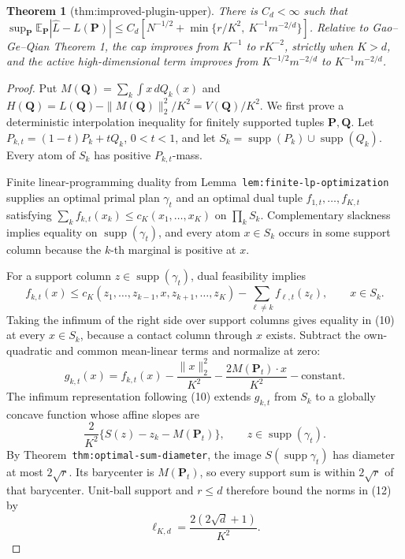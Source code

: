 \documentclass{article}
\newtheorem{theorem}{Theorem}
\begin{document}
\begin{theorem}[thm:improved-plugin-upper]\label{thm:improved-plugin-upper}
There is \(C_d<\infty\) such that \(\sup_{\mathbf P}\mathbb E_{\mathbf P}|\widehat L-L(\mathbf P)|\le C_d[N^{-1/2}+\min\{r/K^2,\ K^{-1}m^{-2/d}\}]\). Relative to Gao--Ge--Qian Theorem 1, the cap improves from \(K^{-1}\) to \(rK^{-2}\), strictly when \(K>d\), and the active high-dimensional term improves from \(K^{-1/2}m^{-2/d}\) to \(K^{-1}m^{-2/d}\).
\end{theorem}
\begin{proof}
Put \(M(\mathbf Q)=\sum_k\int x\,dQ_k(x)\) and \(H(\mathbf Q)=L(\mathbf Q)-\|M(\mathbf Q)\|_2^2/K^2=V(\mathbf Q)/K^2\). We first prove a deterministic interpolation inequality for finitely supported tuples \(\mathbf P,\mathbf Q\). Let \(P_{k,t}=(1-t)P_k+tQ_k\), \(0<t<1\), and let \(S_k=\operatorname{supp}(P_k)\cup\operatorname{supp}(Q_k)\). Every atom of \(S_k\) has positive \(P_{k,t}\)-mass.

Finite linear-programming duality from Lemma~\texttt{lem:finite-lp-optimization} supplies an optimal primal plan \(\gamma_t\) and an optimal dual tuple \(f_{1,t},\ldots,f_{K,t}\) satisfying \(\sum_kf_{k,t}(x_k)\le c_K(x_1,\ldots,x_K)\) on \(\prod_kS_k\). Complementary slackness implies equality on \(\operatorname{supp}(\gamma_t)\), and every atom \(x\in S_k\) occurs in some support column because the \(k\)-th marginal is positive at \(x\).

For a support column \(z\in\operatorname{supp}(\gamma_t)\), dual feasibility implies
\[
f_{k,t}(x)\le c_K(z_1,\ldots,z_{k-1},x,z_{k+1},\ldots,z_K)
-\sum_{\ell\ne k}f_{\ell,t}(z_\ell), \qquad x\in S_k. \tag{10}
\]
Taking the infimum of the right side over support columns gives equality in (10) at every \(x\in S_k\), because a contact column through \(x\) exists. Subtract the own-quadratic and common mean-linear terms and normalize at zero:
\[
g_{k,t}(x)=f_{k,t}(x)-\frac{\|x\|_2^2}{K^2}
-\frac{2M(\mathbf P_t)\mathbin\cdot x}{K^2}-\text{constant}. \tag{11}
\]
The infimum representation following (10) extends \(g_{k,t}\) from \(S_k\) to a globally concave function whose affine slopes are
\[
\frac{2}{K^2}\{S(z)-z_k-M(\mathbf P_t)\},\qquad z\in\operatorname{supp}(\gamma_t). \tag{12}
\]
By Theorem~\texttt{thm:optimal-sum-diameter}, the image \(S(\operatorname{supp}\gamma_t)\) has diameter at most \(2\sqrt r\). Its barycenter is \(M(\mathbf P_t)\), so every support sum is within \(2\sqrt r\) of that barycenter. Unit-ball support and \(r\le d\) therefore bound the norms in (12) by
\[
\ell_{K,d}=\frac{2(2\sqrt d+1)}{K^2}. \tag{13}
\]


\end{proof}
\end{document}
